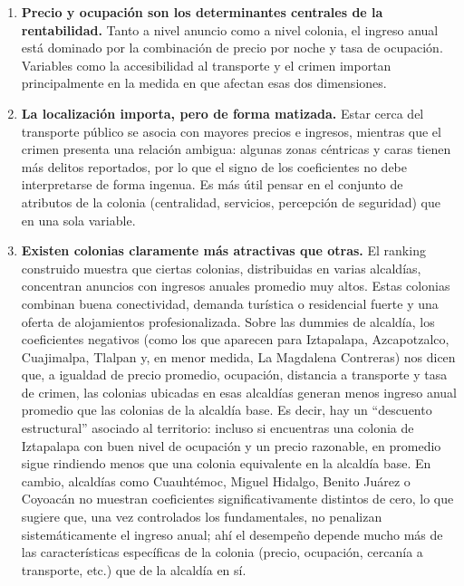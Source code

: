 \documentclass[12pt]{article}
\begin{document}
\begin{enumerate}
  \item \textbf{Precio y ocupación son los determinantes centrales de la rentabilidad.} Tanto a nivel anuncio como a nivel colonia, el ingreso anual está dominado por la combinación de precio por noche y tasa de ocupación. Variables como la accesibilidad al transporte y el crimen importan principalmente en la medida en que afectan esas dos dimensiones.
  \item \textbf{La localización importa, pero de forma matizada.} Estar cerca del transporte público se asocia con mayores precios e ingresos, mientras que el crimen presenta una relación ambigua: algunas zonas céntricas y caras tienen más delitos reportados, por lo que el signo de los coeficientes no debe interpretarse de forma ingenua. Es más útil pensar en el conjunto de atributos de la colonia (centralidad, servicios, percepción de seguridad) que en una sola variable.
  \item \textbf{Existen colonias claramente más atractivas que otras.} El ranking construido muestra que ciertas colonias, distribuidas en varias alcaldías, concentran anuncios con ingresos anuales promedio muy altos. Estas colonias combinan buena conectividad, demanda turística o residencial fuerte y una oferta de alojamientos profesionalizada.
  Sobre las dummies de alcaldía, los coeficientes negativos (como los que aparecen para Iztapalapa, Azcapotzalco, Cuajimalpa, Tlalpan y, en menor medida, La Magdalena Contreras) nos dicen que, a igualdad de precio promedio, ocupación, distancia a transporte y tasa de crimen, las colonias ubicadas en esas alcaldías generan menos ingreso anual promedio que las colonias de la alcaldía base. Es decir, hay un “descuento estructural” asociado al territorio: incluso si encuentras una colonia de Iztapalapa con buen nivel de ocupación y un precio razonable, en promedio sigue rindiendo menos que una colonia equivalente en la alcaldía base. En cambio, alcaldías como Cuauhtémoc, Miguel Hidalgo, Benito Juárez o Coyoacán no muestran coeficientes significativamente distintos de cero, lo que sugiere que, una vez controlados los fundamentales, no penalizan sistemáticamente el ingreso anual; ahí el desempeño depende mucho más de las características específicas de la colonia (precio, ocupación, cercanía a transporte, etc.) que de la alcaldía en sí.

\end{enumerate}
\end{document}
